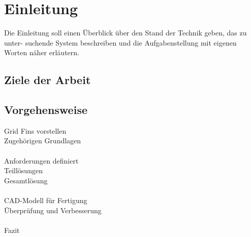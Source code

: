 \chapter{Einleitung}

Die Einleitung soll einen Überblick über den Stand der Technik geben, das zu unter-
suchende System beschreiben und die Aufgabenstellung mit eigenen Worten näher
erläutern.

\section{Ziele der Arbeit}

\section{Vorgehensweise}

Grid Fins vorstellen\\
Zugehörigen Grundlagen\\
~\\
Anforderungen definiert\\
Teillösungen\\
Gesamtlösung\\
~\\
CAD-Modell für Fertigung\\
Überprüfung und Verbesserung\\
~\\
Fazit\\